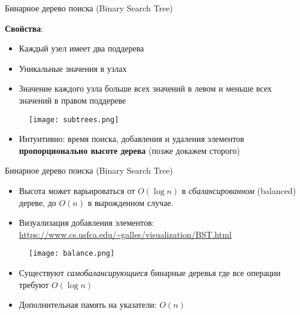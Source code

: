 
\begin{frame}[fragile]{Бинарное дерево поиска (Binary Search Tree)}

{\bf Свойства}:

\begin{itemize}
  \item Каждый узел имеет два поддерева
  \item Уникальные значения в узлах
  \item Значение каждого узла больше всех значений в левом и меньше всех значений в правом поддереве
\end{itemize}

\begin{figure}
  \centering
  \texttt{[image: subtrees.png]}
\end{figure}

\begin{itemize}
  \item Интуитивно: время поиска, добавления и удаления элементов {\bf пропорционально высоте дерева} (позже докажем сторого)
\end{itemize}

\end{frame}


\begin{frame}[fragile]{Бинарное дерево поиска (Binary Search Tree)}


\begin{itemize}
  \item Высота может варьироваться от $O(\log n)$ в {\em сбалансированном} (balanced) дереве, до $O(n)$ в вырожденном случае.
  \item Визуализация добавления элементов: \url{https://www.cs.usfca.edu/~galles/visualization/BST.html}
\end{itemize}

\begin{figure}
  \centering
  \texttt{[image: balance.png]}
\end{figure}

\begin{itemize}
  \item Существуют {\em самобалансирующиеся} бинарные деревья где все операции требуют $O(\log n)$
  \item Дополнительная память на указатели: $O(n)$
\end{itemize}

\end{frame}

